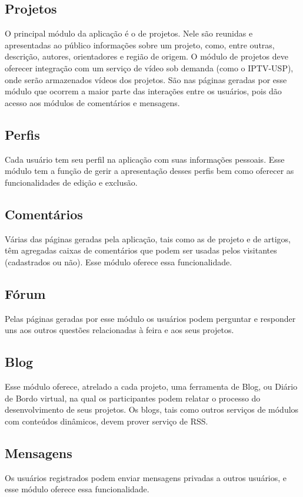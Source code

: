 \documentclass[a4paper,12pt,font=plain,header=plain]{abnt}
\begin{document}
    \subsection{Projetos}
    O principal módulo da aplicação é o de projetos. Nele são reunidas e apresentadas ao público informações sobre um projeto, como, entre outras, descrição, autores, orientadores e região de origem. O módulo de projetos deve oferecer integração com um serviço de vídeo sob demanda (como o IPTV-USP), onde serão armazenados vídeos dos projetos. São nas páginas geradas por esse módulo que ocorrem a maior parte das interações entre os usuários, pois dão acesso aos módulos de comentários e mensagens.

    \subsection{Perfis}
    Cada usuário tem seu perfil na aplicação com suas informações pessoais. Esse módulo tem a função de gerir a apresentação desses perfis bem como oferecer as funcionalidades de edição e exclusão.

    \subsection{Comentários}
    Várias das páginas geradas pela aplicação, tais como as de projeto e de artigos, têm agregadas caixas de comentários que podem ser usadas pelos visitantes (cadastrados ou não). Esse módulo oferece essa funcionalidade.

    \subsection{Fórum}
    Pelas páginas geradas por esse módulo os usuários podem perguntar e responder uns aos outros questões relacionadas à feira e aos seus projetos.

    \subsection{Blog}
    Esse módulo oferece, atrelado a cada projeto, uma ferramenta de Blog, ou Diário de Bordo virtual, na qual os participantes podem relatar o processo do desenvolvimento de seus projetos. Os blogs, tais como outros serviços de
    módulos com conteúdos dinâmicos, devem prover serviço de RSS.

    \subsection{Mensagens}
    Os usuários registrados podem enviar mensagens privadas a outros usuários, e esse módulo oferece essa funcionalidade.
\end{document}
